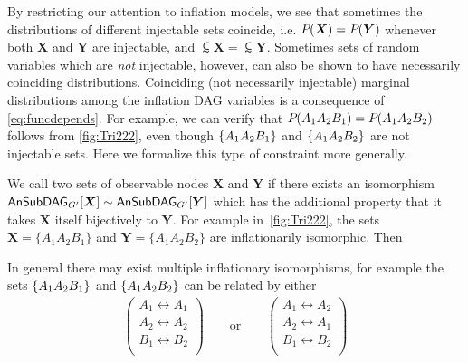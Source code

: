 \begin{asparadesc}
\clearpage\medskip\item[\tred{Coinciding Marginal Distributions}] \noindent
\par\hspace{\parskip}
By restricting our attention to inflation models, we see that sometimes the distributions of different injectable sets coincide, i.e. $\pdf{\bm{X}}=\pdf{\bm{Y}}$ whenever both $\bm{X}$ and $\bm{Y}$ are injectable, and $\subsim{\bm{X}}=\subsim{\bm{Y}}$. Sometimes sets of random variables which are \emph{not} injectable, however, can also be shown to have necessarily coinciding distributions. Coinciding (not necessarily injectable) marginal distributions among the inflation DAG variables is a consequence of \cref{eq:funcdepends}. For example, we can verify that $\pdf{A_1 A_2 B_1}=\pdf{A_1 A_2 B_2}$ follows from \cref{fig:Tri222}, even though $\brackets{A_1 A_2 B_1}$ and $\brackets{A_1 A_2 B_2}$ are not injectable sets. Here we formalize this type of constraint more generally.

We call two sets of observable nodes $\bm{X}$ and $\bm{Y}$  if there exists an isomorphism $\ansubgraph[G']{\bm{X}}\sim\ansubgraph[G']{\bm{Y}}$ which has the additional property that it takes $\bm{X}$ itself bijectively to $\bm{Y}$. For example in~\cref{fig:Tri222}, the sets $\bm{X}=\{A_1 A_2 B_1\}$ and $\bm{Y}=\{A_1 A_2 B_2\}$ are inflationarily isomorphic. Then 

In general there may exist multiple inflationary isomorphisms, for example the sets $\brackets{A_1 A_2 B_1}$ and $\brackets{A_1 A_2 B_2}$ can be related by either 
\begin{align}
    \begin{pmatrix}
     A_1 \leftrightarrow A_1 \\
     A_2 \leftrightarrow A_2 \\
     B_1 \leftrightarrow B_2 \\
    \end{pmatrix}
    \qquad\text{or}\qquad
    \begin{pmatrix}
     A_1 \leftrightarrow A_2 \\
     A_2 \leftrightarrow A_1 \\
     B_1 \leftrightarrow B_2 \\
    \end{pmatrix}
\end{align}


\end{asparadesc}
